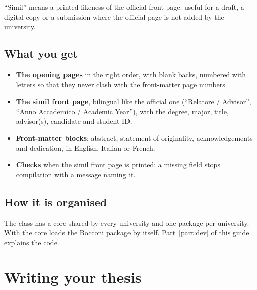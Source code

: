 \documentclass[11pt,a4paper,oneside]{report}
\begin{document}
``Simil'' means a printed likeness of the official front page: useful for
a draft, a digital copy or a submission where the official page is not
added by the university.

\begin{center}
  \hspace{1cm}%
\end{center}

\section{What you get}

\begin{itemize}
  \item \textbf{The opening pages} in the right order, with blank backs,
    numbered with letters so that they never clash with the front-matter
    page numbers.
  \item \textbf{The simil front page}, bilingual like the official one
    (``Relatore / Advisor'', ``Anno Accademico / Academic Year''), with
    the degree, major, title, advisor(s), candidate and student ID.
  \item \textbf{Front-matter blocks}: abstract, statement of originality,
    acknowledgements and dedication, in English, Italian or French.
  \item \textbf{Checks} when the simil front page is printed: a missing
    field stops compilation with a message naming it.
\end{itemize}

\section{How it is organised}

The class has a core shared by every university and one package per
university. With  the core loads the Bocconi
package by itself. Part~\ref{part:dev} of this guide explains the code.



\chapter{Writing your thesis}
\label{ch:writing}
\end{document}
